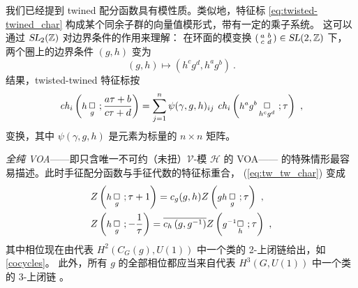 \documentclass[11pt,a4paper,fontset=windows]{ctexart}
\numberwithin{equation}{section}
\newcommand{\SL}{\operatorname{\textsl{SL}}}      %
\newcommand{\ZZ}{\mathbb{Z}}
\newcommand{\Z}{\mathbb{Z}}
\def\c{\gamma}
\def\t{\tau}
\newcommand{\eq}[1]{(\ref{#1})}
\begin{document}

我们已经提到 twined 配分函数具有模性质。类似地，特征标 \eqref{eq:twisted-twined_char}
构成某个同余子群的向量值模形式，带有一定的乘子系统。
这可以通过 $\SL_2(\Z)$ 对边界条件的作用来理解：
在环面的模变换 $(\begin{smallmatrix} a& b \\c&d\end{smallmatrix})\in\SL(2,\ZZ)$ 下，
两个圈上的边界条件 $(g,h)$ 变为
\begin{equation}
\label{eq:orb_b.c.}
(g,h)\mapsto\left(h^cg^d,h^ag^b\right)~.
\end{equation}
结果，twisted-twined 特征标按
\begin{equation}
\label{eq:tw_tw_char}
{\it ch}_i\left(\mbox{\fontsize{9}{10}\selectfont $h\,$}\underset{g}{\Box}~;\frac{a\tau+b}{c\tau+d}\right) =\sum_{j=1}^n\psi(\gamma,g,h)_{ij}~ {\it ch}_i\left(\mbox{\fontsize{9}{10}\selectfont $h^ag^b\,$}\underset{h^cg^d}{\Box}~;\t\right)~,
\end{equation}
变换，其中 $\psi(\gamma,g,h)$ 是元素为标量的 $n\times n$ 矩阵。


\emph{全纯 VOA}——即只含唯一不可约（未扭）$\mathcal{V}$-模 $\mathcal{H}$ 的 VOA——
的特殊情形最容易描述。此时手征配分函数与手征代数的特征标重合，
\eq{eq:tw_tw_char} 变成 \cite{BantayP.1990OaHa}
\begin{equation}\label{eqn:modular_boundary_condition}
\begin{split}
&Z\left(\mbox{\fontsize{9}{10}\selectfont $h\,$}\underset{g}{\Box}~;\t+1\right)=c_g(g,h)Z\left(\mbox{\fontsize{9}{10}\selectfont $gh\,$}\underset{g}{\Box}~;\t\right)~, \\
&Z\left(\mbox{\fontsize{9}{10}\selectfont $h\,$}\underset{g}{\Box}~;-{1\over\t}\right)=\overline{c_h\left(g,g^{-1}\right)}Z\left(\mbox{\fontsize{9}{10}\selectfont $g^{-1}$}\underset{h}{\Box}~;\t\right)~,
\end{split}
\end{equation}
其中相位现在由代表 $H^2(C_G(g),U(1))$ 中一个类的 2-上闭链给出，如 \eqref{cocycles}。
此外，所有 $g$ 的全部相位都应当来自代表 $H^3(G,U(1))$ 中一个类的 3-上闭链
\cite{Roche:1990hs,BantayP.1990OaHa}。
\end{document}
